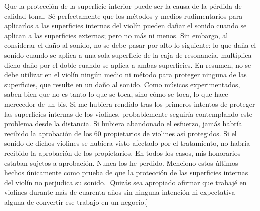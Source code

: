 Que la protección de la superficie interior puede ser la causa de la pérdida de calidad tonal. Sé perfectamente que los métodos y medios rudimentarios para aplicarlos a las superficies internas del violín pueden dañar el sonido cuando se aplican a las superficies externas; pero no más ni menos. Sin embargo, al considerar el daño al sonido, no se debe pasar por alto lo siguiente: lo que daña el sonido cuando se aplica a una sola superficie de la caja de resonancia, multiplica dicho daño por el doble cuando se aplica a ambas superficies. En resumen, no se debe utilizar en el violín ningún medio ni método para proteger ninguna de las superficies, que resulte en un daño al sonido. Como músicos experimentados, saben bien que no es tanto lo que se toca, sino cómo se toca, lo que hace merecedor de un bis.
Si me hubiera rendido tras los primeros intentos de proteger las superficies internas de los violines, probablemente seguiría contemplando este problema desde la distancia. Si hubiera abandonado el esfuerzo, jamás habría recibido la aprobación de los 60 propietarios de violines así protegidos. Si el sonido de dichos violines se hubiera visto afectado por el tratamiento, no habría recibido la aprobación de los propietarios. En todos los casos, mis honorarios estaban sujetos a aprobación. Nunca los he perdido. Menciono estos últimos hechos únicamente como prueba de que la protección de las superficies internas del violín no perjudica su sonido.
[Quizás sea apropiado afirmar que trabajé en violines durante más de cuarenta años sin ninguna intención ni expectativa alguna de convertir ese trabajo en un negocio.]

